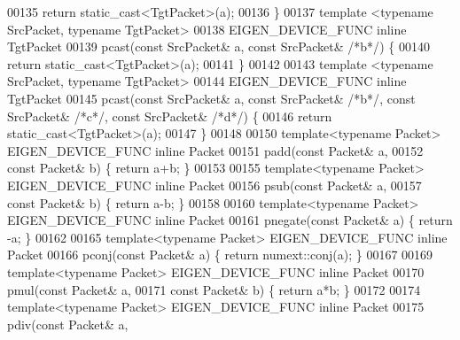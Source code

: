 \begin{DoxyCode}
00135   \textcolor{keywordflow}{return} \textcolor{keyword}{static\_cast<}TgtPacket\textcolor{keyword}{>}(a);
00136 \}
00137 \textcolor{keyword}{template} <\textcolor{keyword}{typename} SrcPacket, \textcolor{keyword}{typename} TgtPacket>
00138 EIGEN\_DEVICE\_FUNC \textcolor{keyword}{inline} TgtPacket
00139 pcast(\textcolor{keyword}{const} SrcPacket& a, \textcolor{keyword}{const} SrcPacket& \textcolor{comment}{/*b*/}) \{
00140   \textcolor{keywordflow}{return} \textcolor{keyword}{static\_cast<}TgtPacket\textcolor{keyword}{>}(a);
00141 \}
00142 
00143 \textcolor{keyword}{template} <\textcolor{keyword}{typename} SrcPacket, \textcolor{keyword}{typename} TgtPacket>
00144 EIGEN\_DEVICE\_FUNC \textcolor{keyword}{inline} TgtPacket
00145 pcast(\textcolor{keyword}{const} SrcPacket& a, \textcolor{keyword}{const} SrcPacket& \textcolor{comment}{/*b*/}, \textcolor{keyword}{const} SrcPacket& \textcolor{comment}{/*c*/}, \textcolor{keyword}{const} SrcPacket& \textcolor{comment}{/*d*/}) \{
00146   \textcolor{keywordflow}{return} \textcolor{keyword}{static\_cast<}TgtPacket\textcolor{keyword}{>}(a);
00147 \}
00148 
00150 \textcolor{keyword}{template}<\textcolor{keyword}{typename} Packet> EIGEN\_DEVICE\_FUNC \textcolor{keyword}{inline} Packet
00151 padd(\textcolor{keyword}{const} Packet& a,
00152         \textcolor{keyword}{const} Packet& b) \{ \textcolor{keywordflow}{return} a+b; \}
00153 
00155 \textcolor{keyword}{template}<\textcolor{keyword}{typename} Packet> EIGEN\_DEVICE\_FUNC \textcolor{keyword}{inline} Packet
00156 psub(\textcolor{keyword}{const} Packet& a,
00157         \textcolor{keyword}{const} Packet& b) \{ \textcolor{keywordflow}{return} a-b; \}
00158 
00160 \textcolor{keyword}{template}<\textcolor{keyword}{typename} Packet> EIGEN\_DEVICE\_FUNC \textcolor{keyword}{inline} Packet
00161 pnegate(\textcolor{keyword}{const} Packet& a) \{ \textcolor{keywordflow}{return} -a; \}
00162 
00165 \textcolor{keyword}{template}<\textcolor{keyword}{typename} Packet> EIGEN\_DEVICE\_FUNC \textcolor{keyword}{inline} Packet
00166 pconj(\textcolor{keyword}{const} Packet& a) \{ \textcolor{keywordflow}{return} numext::conj(a); \}
00167 
00169 \textcolor{keyword}{template}<\textcolor{keyword}{typename} Packet> EIGEN\_DEVICE\_FUNC \textcolor{keyword}{inline} Packet
00170 pmul(\textcolor{keyword}{const} Packet& a,
00171         \textcolor{keyword}{const} Packet& b) \{ \textcolor{keywordflow}{return} a*b; \}
00172 
00174 \textcolor{keyword}{template}<\textcolor{keyword}{typename} Packet> EIGEN\_DEVICE\_FUNC \textcolor{keyword}{inline} Packet
00175 pdiv(\textcolor{keyword}{const} Packet& a,

\end{DoxyCode}
